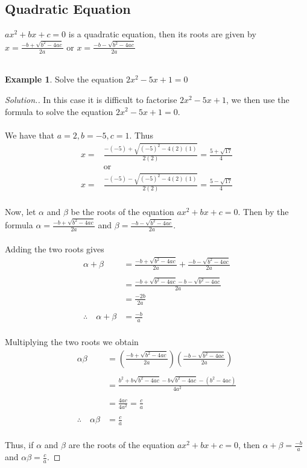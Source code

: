 \documentclass[11pt,a4paper]{article}
\theoremstyle{definition}
\newtheorem{example}[thm]{Example}
\newenvironment{solution}
  {\renewcommand{\qedsymbol}{}\begin{proof}[\textit{Solution}.]}
  {\end{proof}}
\begin{document}
\subsection{Quadratic Equation}
$ax^2+bx+c=0$ is a quadratic equation, then its roots are given by $x=\frac{-b+\sqrt{b^2-4ac}}{2a}$ or $x=\frac{-b-\sqrt{b^2-4ac}}{2a}$\\\\

\begin{example}

Solve the equation $2x^2-5x+1=0$
\end{example}
\begin{solution}

In this case it is difficult to factorise $2x^2-5x+1$, we then use the formula to solve the equation $2x^2-5x+1=0$.\\\\
We have that $a=2, b=-5, c=1$. Thus
\begin{align*}
x= &\frac{-(-5)+\sqrt{(-5)^2-4(2)(1)}}{2(2)}=\frac{5+\sqrt{17}}{4}\\
&\text{or}\\
x = & \frac{-(-5)-\sqrt{(-5)^2-4(2)(1)}}{2(2)}=\frac{5-\sqrt{17}}{4}\\
\end{align*}


Now, let $\alpha$ and $\beta$ be the roots of the equation $ax^2+bx+c=0$. Then by the formula $\alpha = \frac{-b+\sqrt{b^2-4ac}}{2a}$ and $\beta =\frac{-b-\sqrt{b^2-4ac}}{2a}$.\\\\

Adding the two roots gives
\begin{align*}
\alpha + \beta & = \frac{-b+\sqrt{b^2-4ac}}{2a}+\frac{-b-\sqrt{b^2-4ac}}{2a}\\\\ 
               & = \frac{-b+\sqrt{b^2-4ac}-b-\sqrt{b^2-4ac}}{2a}\\
               & = \frac{-2b}{2a}\\\\
\therefore \quad  \alpha + \beta  & =\frac{-b}{a}\\
\end{align*}



Multiplying the two roots we obtain
\begin{align*}
\alpha \beta & = \left(\frac{-b+\sqrt{b^2-4ac}}{2a}\right)\left(\frac{-b-\sqrt{b^2-4ac}}{2a}\right)\\\\
             & = \frac{b^2+b\sqrt{b^2-4ac}-b\sqrt{b^2-4ac}-(b^2-4ac)}{4a^2}\\\\
             & = \frac{4ac}{4a^2}=\frac{c}{a}\\\\
\therefore \quad  \alpha \beta & = \frac{c}{a}\\
\end{align*}

Thus, if $\alpha$ and $\beta$ are the roots of the equation $ax^2+bx+c=0$, then $\alpha +\beta =\frac{-b}{a}$ and $\alpha \beta =\frac{c}{a}$.
\end{solution}
\end{document}
